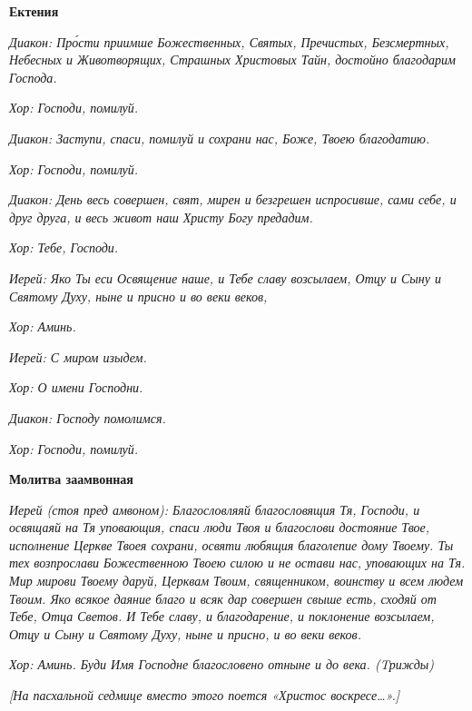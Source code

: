 \bfseries Ектения\normalfont{}


 \itshape Диакон:\normalfont{} Про́сти приимше Божественных, Святых, Пречистых,
Безсмертных, Небесных и Животворящих, Страшных Христовых Тайн,
достойно благодарим Господа.


 \itshape Хор:\normalfont{} Господи, помилуй.


 \itshape Диакон:\normalfont{} Заступи, спаси, помилуй и сохрани нас, Боже, Твоею
благодатию.


 \itshape Хор:\normalfont{} Господи, помилуй.


 \itshape Диакон:\normalfont{} День весь совершен, свят, мирен и безгрешен испросивше, сами
себе, и друг друга, и весь живот наш Христу Богу предадим.


 \itshape Хор:\normalfont{} Тебе, Господи.


 \itshape Иерей:\normalfont{} Яко Ты еси Освящение наше, и Тебе славу возсылаем, Отцу и
Сыну и Святому Духу, ныне и присно и во веки веков,


 \itshape Хор:\normalfont{} Аминь.


 \itshape Иерей:\normalfont{} С миром изыдем.


 \itshape Хор:\normalfont{} О имени Господни.


 \itshape Диакон:\normalfont{} Господу помолимся.


 \itshape Хор:\normalfont{} Господи, помилуй.



 

\bfseries Молитва заамвонная\normalfont{}


 \itshape Иерей (стоя пред амвоном):\normalfont{} Благословляяй благословящия Тя, Господи, и
освящаяй на Тя уповающия, спаси люди Твоя и благослови достояние Твое,
исполнение Церкве Твоея сохрани, освяти любящия благолепие дому Твоему.
Ты тех возпрослави Божественною Твоею силою и не остави нас, уповающих
на Тя. Мир мирови Твоему даруй, Церквам Твоим, священником, воинству и
всем людем Твоим. Яко всякое даяние благо и всяк дар совершен свыше
есть, сходяй от Тебе, Отца Светов. И Тебе славу, и благодарение, и
поклонение возсылаем, Отцу и Сыну и Святому Духу, ныне и присно, и во
веки веков.


 \itshape Хор:\normalfont{} Аминь. Буди Имя Господне благословено отныне и до века.
\itshape (Tрижды)\normalfont{}


 \itshape [На пасхальной седмице вместо этого поется «Христос воскресе…».]\normalfont{}



